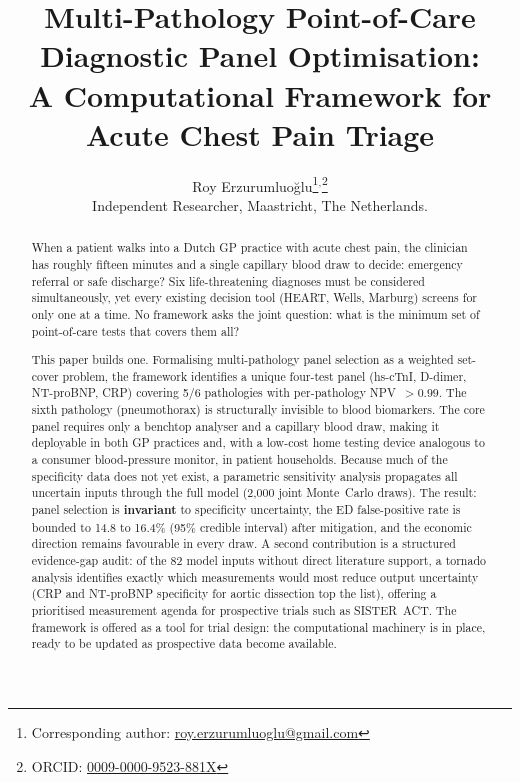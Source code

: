 \documentclass[11pt, oneside]{article}
\providecommand{\shorttitle}[1]{}
\begin{document}
\title{Multi-Pathology Point-of-Care Diagnostic Panel Optimisation:\\A Computational Framework for Acute Chest Pain Triage}
\shorttitle{POCT Panel Optimisation: PACE}

\author{Roy Erzurumluoğlu\thanks{Corresponding author: \href{mailto:roy.erzurumluoglu@gmail.com}{roy.erzurumluoglu@gmail.com}}$^{,}$\thanks{ORCID: \href{https://orcid.org/0009-0000-9523-881X}{0009-0000-9523-881X}}\\
  Independent Researcher, Maastricht, The Netherlands.}

\maketitle

\begin{abstract}
When a patient walks into a Dutch GP practice with acute chest pain, the clinician has roughly fifteen minutes and a single capillary blood draw to decide: emergency referral or safe discharge? Six life-threatening diagnoses must be considered simultaneously, yet every existing decision tool (HEART, Wells, Marburg) screens for only one at a time. No framework asks the joint question: what is the minimum set of point-of-care tests that covers them all?

This paper builds one. Formalising multi-pathology panel selection as a weighted set-cover problem, the framework identifies a unique four-test panel (hs-cTnI, D-dimer, NT-proBNP, CRP) covering 5/6 pathologies with per-pathology NPV~$> 0.99$. The sixth pathology (pneumothorax) is structurally invisible to blood biomarkers. The core panel requires only a benchtop analyser and a capillary blood draw, making it deployable in both GP practices and, with a low-cost home testing device analogous to a consumer blood-pressure monitor, in patient households. Because much of the specificity data does not yet exist, a parametric sensitivity analysis propagates all uncertain inputs through the full model (2{,}000 joint Monte~Carlo draws). The result: panel selection is \textbf{invariant} to specificity uncertainty, the ED false-positive rate is bounded to 14.8 to 16.4\% (95\% credible interval) after mitigation, and the economic direction remains favourable in every draw. A second contribution is a structured evidence-gap audit: of the 82 model inputs without direct literature support, a tornado analysis identifies exactly which measurements would most reduce output uncertainty (CRP and NT-proBNP specificity for aortic dissection top the list), offering a prioritised measurement agenda for prospective trials such as SISTER~ACT. The framework is offered as a tool for trial design: the computational machinery is in place, ready to be updated as prospective data become available.
\end{abstract}
\end{document}

